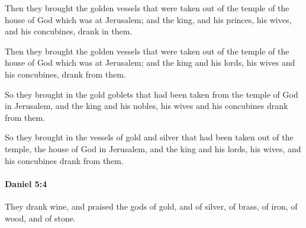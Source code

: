			Then they brought the golden vessels that were taken out of the temple of the house of God which was at Jerusalem; and the king, and his princes, his wives, and his concubines, drank in them.

			\begin{versebox}
					\item[BHS] 
					\item[LXX] 
					\item[ASV] Then they brought the golden vessels that were taken out of the temple of the house of God which was at Jerusalem; and the king and his lords, his wives and his concubines, drank from them.
					\item[NIV] So they brought in the gold goblets that had been taken from the temple of God in Jerusalem, and the king and his nobles, his wives and his concubines drank from them.
					\item[NRSV] So they brought in the vessels of gold and silver that had been taken out of the temple, the house of God in Jerusalem, and the king and his lords, his wives, and his concubines drank from them.
			\end{versebox}

		\paragraph{Daniel 5:4} %
			\label{DANIEL-5-4}

			They drank wine, and praised the gods of gold, and of silver, of brass, of iron, of wood, and of stone.

